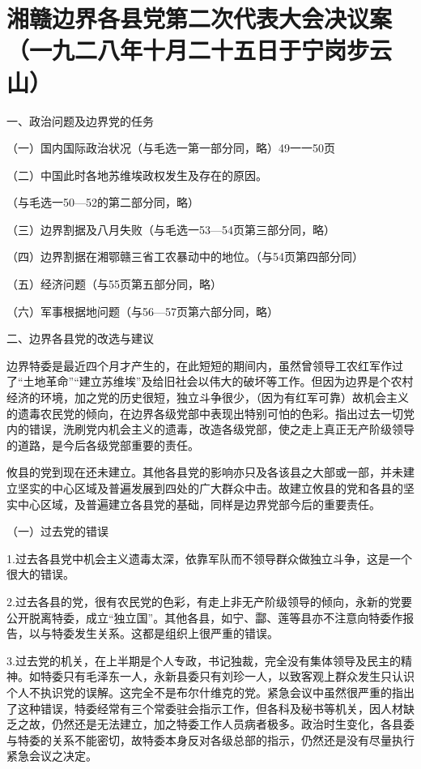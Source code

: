 \section[湘赣边界各县党第二次代表大会决议案（一九二八年十月二十五日于宁岗步云山）]{湘赣边界各县党第二次代表大会决议案（一九二八年十月二十五日于宁岗步云山）}


一、政治问题及边界党的任务

（一）国内国际政治状况（与毛选一第一部分同，略）49一一50页

（二）中国此时各地苏维埃政权发生及存在的原因。

（与毛选一50—52的第二部分同，略）

（三）边界割据及八月失败（与毛选一53—54页第三部分同，略）

（四）边界割据在湘鄂赣三省工农暴动中的地位。（与54页第四部分同）

（五）经济问题（与55页第五部分同，略）

（六）军事根据地问题（与56—57页第六部分同，略）

二、边界各县党的改选与建议

边界特委是最近四个月才产生的，在此短短的期间内，虽然曾领导工农红军作过了“土地革命”“建立苏维埃”及给旧社会以伟大的破坏等工作。但因为边界是个农村经济的环境，加之党的历史很短，独立斗争很少，（因为有红军可靠）故机会主义的遗毒农民党的倾向，在边界各级党部中表现出特别可怕的色彩。指出过去一切党内的错误，洗刷党内机会主义的遗毒，改造各级党部，使之走上真正无产阶级领导的道路，是今后各级党部重要的责任。

攸县的党到现在还未建立。其他各县党的影响亦只及各该县之大部或一部，并未建立坚实的中心区域及普遍发展到四处的广大群众中击。故建立攸县的党和各县的坚实中心区域，及普遍建立各县党的基础，同样是边界党部今后的重要责任。

（一）过去党的错误

1.过去各县党中机会主义遗毒太深，依靠军队而不领导群众做独立斗争，这是一个很大的错误。

2.过去各县的党，很有农民党的色彩，有走上非无产阶级领导的倾向，永新的党要公开脱离特委，成立“独立国”。其他各县，如宁、酃、莲等县亦不注意向特委作报告，以与特委发生关系。这都是组织上很严重的错误。

3.过去党的机关，在上半期是个人专政，书记独裁，完全没有集体领导及民主的精神。如特委只有毛泽东一人，永新县委只有刘珍一人，以致客观上群众发生只认识个人不执识党的误解。这完全不是布尔什维克的党。紧急会议中虽然很严重的指出了这种错误，特委经常有三个常委驻会指示工作，但各科及秘书等机关，因人材缺乏之故，仍然还是无法建立，加之特委工作人员病者极多。政治时生变化，各县委与特委的关系不能密切，故特委本身反对各级总部的指示，仍然还是没有尽量执行紧急会议之决定。

